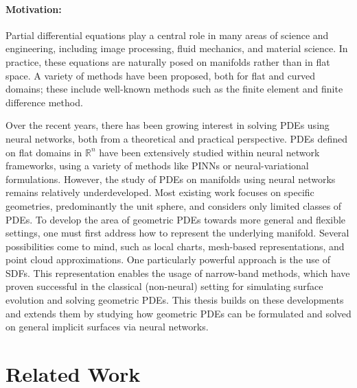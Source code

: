 \documentclass[draft,12pt,openany]{book}
\newcommand{\R}{\mathbb{R}}
\theoremstyle{plainnormal}
\theoremstyle{remark}
\begin{document}
\paragraph{Motivation:} Partial differential equations play a central role in many areas of science and engineering, including image processing, fluid mechanics, and material science. In practice, these equations are naturally posed on manifolds rather than in flat space. A variety of methods have been proposed, both for flat and curved domains; these include well-known methods such as the finite element and finite difference method. \par
Over the recent years, there has been growing interest in solving PDEs using neural networks, both from a theoretical and practical perspective. PDEs defined on flat domains in $\R^n$ have been extensively studied within neural network frameworks, using a variety of methods like PINNs or neural-variational formulations. However, the study of PDEs on manifolds using neural networks remains relatively underdeveloped. Most existing work focuses on specific geometries, predominantly the unit sphere, and considers only limited classes of PDEs.
To develop the area of geometric PDEs towards more general and flexible settings, one must first address how to represent the underlying manifold. Several possibilities come to mind, such as local charts, mesh-based representations, and point cloud approximations. One particularly powerful approach is the use of SDFs. This representation enables the usage of narrow-band methods, which have proven successful in the classical (non-neural) setting for simulating surface evolution and solving geometric PDEs.
This thesis builds on these developments and extends them by studying how geometric PDEs can be formulated and solved on general implicit surfaces via neural networks.
\section{Related Work}
\end{document}
